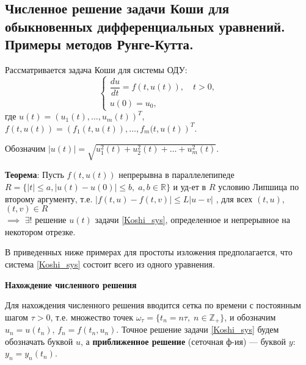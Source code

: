 \subsection{Численное решение задачи Коши для обыкновенных дифференциальных уравнений. Примеры методов Рунге-Кутта.}


Рассматривается задача Коши для системы ОДУ:
\begin{equation}
%
    \label{Koshi_sys}
    \begin{cases}
        \dfrac{du}{dt} = f(t, u(t)), \quad t > 0, \\
        u(0) = u_0,
    \end{cases}
\end{equation}
%
где
$u(t)=\left(u_1(t), \dots, u_m(t)\right)^T$, $f(t, u(t)) = \left(f_1(t, u(t)), \dots, f_m(t,u(t)\right)^T$.

Обозначим $ | u(t) | = \sqrt{u_1^2(t) + u_2^2(t) + \ldots + u_m^2(t)}$.

\textbf{Теорема}: Пусть $f(t, u(t))$ непрерывна в параллелепипеде 
$ R = \{|t| \leqslant a, | u(t)-u(0)| \leqslant b,\; a, b\in\mathbb{R}\} $ 
и уд-ет в $R$ условию Липшица по второму аргументу, т.е. 
$|f(t, u) - f(t, v)| \leqslant L|u - v|$
, для всех $(t, u)$, $(t, v) \in R$\\ 
$\implies $
$\exists!$ решение $u(t)$ задачи \eqref{Koshi_sys}, определенное и непрерывное на некотором отрезке.



В приведенных ниже примерах для простоты изложения предполагается, что
система \eqref{Koshi_sys} состоит всего из одного уравнения.

\centerline{\textbf{Нахождение численного решения}}


Для нахождения численного решения вводится сетка по времени с постоянным шагом $\tau>0$, т.е. множество точек
$\omega_\tau = \{t_n = n\tau,\;n \in \mathbb{Z}_+\}$, и обозначим
$u_n = u(t_n)$, $f_n = f(t_n, u_n)$.
Точное решение задачи \eqref{Koshi_sys} будем обозначать буквой $u$,
а \textbf{приближенное решение} (сеточная ф-ия) --- буквой $y$: $y_n = y_n(t_n)$.

